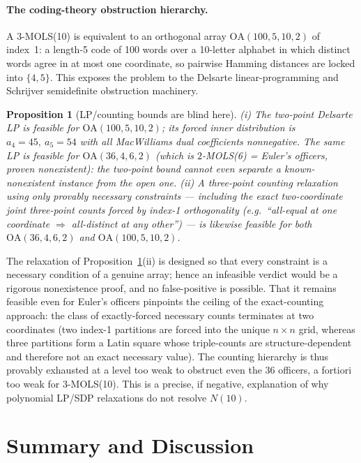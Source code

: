\documentclass[11pt,a4paper]{article}
\newtheorem{proposition}[theorem]{Proposition}
\theoremstyle{remark}
\begin{document}
\paragraph{The coding-theory obstruction hierarchy.}
A 3-MOLS(10) is equivalent to an orthogonal array $\mathrm{OA}(100,5,10,2)$
of index~1: a length-5 code of 100 words over a 10-letter alphabet in which
distinct words agree in at most one coordinate, so pairwise Hamming
distances are locked into $\{4,5\}$. This exposes the problem to the
Delsarte linear-programming and Schrijver semidefinite obstruction machinery.

\begin{proposition}[LP/counting bounds are blind here]\label{prop:coding}
{\normalfont(i)} The two-point Delsarte LP is feasible for
$\mathrm{OA}(100,5,10,2)$; its forced inner distribution is
$a_4=45,\ a_5=54$ with all MacWilliams dual coefficients nonnegative. The
\emph{same} LP is feasible for $\mathrm{OA}(36,4,6,2)$ (which is
$2$-MOLS(6) = Euler's officers, \emph{proven nonexistent}): the two-point
bound cannot even separate a known-nonexistent instance from the open one.
{\normalfont(ii)} A three-point counting relaxation using only provably
necessary constraints --- including the exact two-coordinate joint
three-point counts forced by index-1 orthogonality (e.g.\ ``all-equal at
one coordinate $\Rightarrow$ all-distinct at any other'') --- is likewise
feasible for both $\mathrm{OA}(36,4,6,2)$ and $\mathrm{OA}(100,5,10,2)$.
\end{proposition}

The relaxation of Proposition~\ref{prop:coding}(ii) is designed so that
every constraint is a necessary condition of a genuine array; hence an
infeasible verdict would be a rigorous nonexistence proof, and no
false-positive is possible. That it remains feasible even for Euler's
officers pinpoints the ceiling of the exact-counting approach: the class of
exactly-forced necessary counts terminates at two coordinates (two
index-1 partitions are forced into the unique $n\times n$ grid, whereas
three partitions form a Latin square whose triple-counts are
structure-dependent and therefore not an exact necessary value). The
counting hierarchy is thus provably exhausted at a level too weak to
obstruct even the 36 officers, a fortiori too weak for 3-MOLS(10). This is
a precise, if negative, explanation of why polynomial LP/SDP relaxations do
not resolve $N(10)$.

\section{Summary and Discussion}
\label{sec:discussion}
\end{document}
